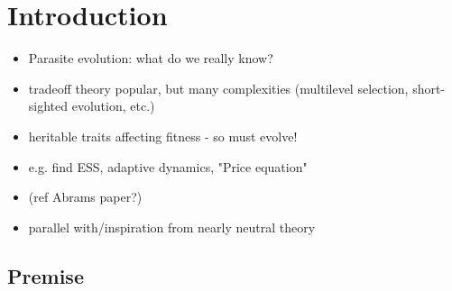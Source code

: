 \section*{Introduction}

\begin{itemize}
    \item Parasite evolution: what do we really know?
    \item tradeoff theory popular, but many complexities (multilevel selection, short-sighted evolution, etc.)
    \item heritable traits affecting fitness - so must evolve!
    \item e.g. find ESS, adaptive dynamics, "Price equation"
    \item (ref Abrams paper?)
    \item parallel with/inspiration from nearly neutral theory
\end{itemize}

\subsection*{Premise}

